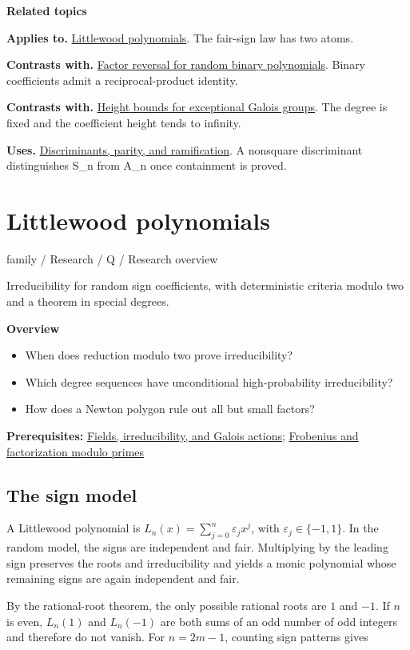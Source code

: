\documentclass[11pt,a4paper,oneside,openany]{book}
\begin{document}
\par\medskip\begingroup\footnotesize\setlength{\parskip}{1pt}\textbf{\sffamily\color{atlasgreen}Related topics}\par
\color{black}\textbf{Applies to.} \hyperlink{article:littlewood}{Littlewood polynomials}. The fair-sign law has two atoms.\par
\color{black}\textbf{Contrasts with.} \hyperlink{article:factor-reversal}{Factor reversal for random binary polynomials}. Binary coefficients admit a reciprocal-product identity.\par
\color{black}\textbf{Contrasts with.} \hyperlink{article:height-counting}{Height bounds for exceptional Galois groups}. The degree is fixed and the coefficient height tends to infinity.\par
\color{black}\textbf{Uses.} \hyperlink{article:discriminants}{Discriminants, parity, and ramification}. A nonsquare discriminant distinguishes S\_\allowbreak{}n from A\_\allowbreak{}n once containment is proved.\par
\endgroup
\chapter{Littlewood polynomials}\label{article:littlewood}\hypertarget{article:littlewood}{}\color{black}
{\sffamily\small\color{atlasgold}family / Research / Q / Research overview}\par\medskip
Irreducibility for random sign coefficients, with deterministic criteria modulo two and a theorem in special degrees.\par\medskip
\textbf{Overview}\begin{itemize}
\item When does reduction modulo two prove irreducibility?
\item Which degree sequences have unconditional high-probability irreducibility?
\item How does a Newton polygon rule out all but small factors?
\end{itemize}
{\small\textbf{Prerequisites:} \hyperlink{article:foundations}{Fields, irreducibility, and Galois actions}; \hyperlink{article:frobenius}{Frobenius and factorization modulo primes}}\par
{}\section{The sign model}
\color{black} A Littlewood polynomial is \(L_n(x)=\sum_{j=0}^{n}\varepsilon_jx^j\), with \(\varepsilon_j\in\{-1,1\}\). In the random model, the signs are independent and fair. Multiplying by the leading sign preserves the roots and irreducibility and yields a monic polynomial whose remaining signs are again independent and fair.\par
\color{black} By the rational-root theorem, the only possible rational roots are \(1\) and \(-1\). If \(n\) is even, \(L_n(1)\) and \(L_n(-1)\) are both sums of an odd number of odd integers and therefore do not vanish. For \(n=2m-1\), counting sign patterns gives\par
\end{document}
